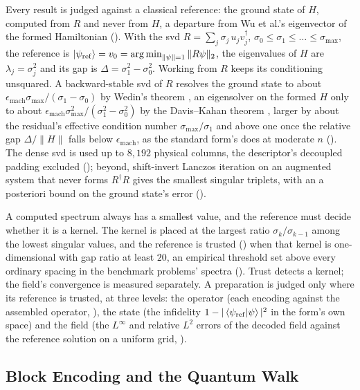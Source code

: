 Every result is judged against a classical reference: the ground state of $H$, computed from $R$ and never from $H$, a departure from Wu et al.'s eigenvector of the formed Hamiltonian (). With the \gls{svd} $R=\sum_j\sigma_j\,u_jv_j^\dagger$, $\sigma_0\le\sigma_1\le\dots\le\sigma_{\max}$, the reference is $\ket{\psi_{\mathrm{ref}}}=v_0=\operatorname{arg\,min}_{\|\psi\|=1}\|R\psi\|_2$, the eigenvalues of $H$ are $\lambda_j=\sigma_j^2$ and its gap is $\Delta=\sigma_1^2-\sigma_0^2$. Working from $R$ keeps its conditioning unsquared. A backward-stable \gls{svd} of $R$ resolves the ground state to about $\epsilon_{\mathrm{mach}}\sigma_{\max}/(\sigma_1-\sigma_0)$ by Wedin's theorem \cite{wedin1972perturbation}, an eigensolver on the formed $H$ only to about $\epsilon_{\mathrm{mach}}\sigma_{\max}^2/(\sigma_1^2-\sigma_0^2)$ by the Davis--Kahan theorem \cite{daviskahan1970rotation}, larger by about the residual's effective condition number $\sigma_{\max}/\sigma_1$ and above one once the relative gap $\Delta/\|H\|$ falls below $\epsilon_{\mathrm{mach}}$, as the standard form's does at moderate $n$ (). The dense \gls{svd} is used up to $8{,}192$ physical columns, the descriptor's decoupled padding excluded (); beyond, shift-invert Lanczos iteration on an augmented system that never forms $R^\dagger R$ gives the smallest singular triplets, with an a posteriori bound on the ground state's error ().

A computed spectrum always has a smallest value, and the reference must decide whether it is a kernel. The kernel is placed at the largest ratio $\sigma_k/\sigma_{k-1}$ among the lowest singular values, and the reference is trusted () when that kernel is one-dimensional with gap ratio at least $20$, an empirical threshold set above every ordinary spacing in the benchmark problems' spectra (). Trust detects a kernel; the field's convergence is measured separately. A preparation is judged only where its reference is trusted, at three levels: the operator (each encoding against the assembled operator, ), the state (the infidelity $1-|\braket{\psi_{\mathrm{ref}}|\psi}|^2$ in the form's own space) and the field (the $L^\infty$ and relative $L^2$ errors of the decoded field against the reference solution on a uniform grid, ).

\subsection{Block Encoding and the Quantum Walk}
\label{sec:pipeline-walk}

